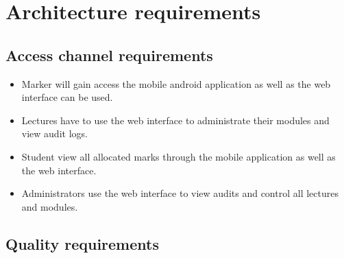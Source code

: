 \documentclass[12pt]{article}
\begin{document}
		\vspace{0.2in}

	\section{Architecture requirements}
	
		\vspace{0.2in}
		
		\subsection{Access channel requirements}
		
			\vspace{0.2in}
			\begin{itemize}
				\item Marker will gain access the mobile android application as well as the web interface can be used.
				\item Lectures have to use the web interface to administrate their modules and view audit logs.
				\item Student view all allocated marks through the mobile application as well as the web interface.
				\item Administrators use the web interface to view audits and control all lectures and modules.
			\end{itemize}
			

		\subsection{Quality requirements}
		
			\vspace{0.2in}
			
\end{document}
